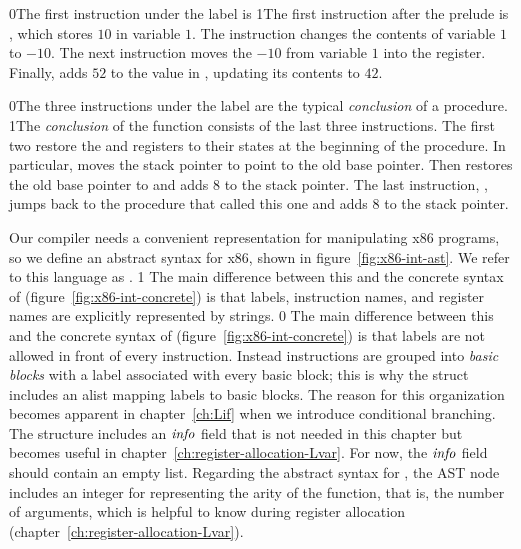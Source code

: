 \documentclass[7x10]{TimesAPriori_MIT}%
\def\racketEd{0}
\def\pythonEd{1}
\def\edition{1}
\newcommand{\racket}[1]{{\if\edition\racketEd{#1}\fi}}
\newcommand{\pythonColor}[0]{}
\newcommand{\python}[1]{{\if\edition\pythonEd\pythonColor #1\fi}}
\numberwithin{theorem}{chapter}
\numberwithin{definition}{chapter}
\numberwithin{equation}{chapter}
\begin{document}
\racket{The first instruction under the  label is}
%
\python{The first instruction after the prelude is}
%
, which stores $10$ in variable $1$.
%
The instruction  changes the contents of variable
$1$ to $-10$.
%
The next instruction moves the $-10$ from variable $1$ into the
 register.  Finally,  adds $52$ to
the value in , updating its contents to $42$.

\racket{The three instructions under the label  are the
  typical \emph{conclusion} of a procedure.}
%
\python{The \emph{conclusion}\index{subject}{conclusion} of the
  \code{main} function consists of the last three instructions.}
%
The first two restore the  and  registers to their
states at the beginning of the procedure. In particular,
 moves the stack pointer to point to the
old base pointer. Then  restores the old base pointer
to  and adds $8$ to the stack pointer.  The last instruction,
, jumps back to the procedure that called this one and adds
$8$ to the stack pointer.

Our compiler needs a convenient representation for manipulating x86
programs, so we define an abstract syntax for x86, shown in
figure~\ref{fig:x86-int-ast}. We refer to this language as
\LangXInt{}.
%
{\if\edition\pythonEd\pythonColor%
  The main difference between this and the concrete syntax of \LangXInt{}
  (figure~\ref{fig:x86-int-concrete}) is that labels, instruction
  names, and register names are explicitly represented by strings. 
\fi} %
{\if\edition\racketEd  
The main difference between this and the concrete syntax of \LangXInt{}
(figure~\ref{fig:x86-int-concrete}) is that labels are not allowed in
front of every instruction. Instead instructions are grouped into
\emph{basic blocks} with a
label associated with every basic block; this is why the 
struct includes an alist mapping labels to basic blocks. The reason for this
organization becomes apparent in chapter~\ref{ch:Lif} when we
introduce conditional branching. The  structure includes
an $\mathit{info}$ field that is not needed in this chapter but becomes
useful in chapter~\ref{ch:register-allocation-Lvar}.  For now, the
$\mathit{info}$ field should contain an empty list.
\fi}
%
Regarding the abstract syntax for , the  AST
node includes an integer for representing the arity of the function,
that is, the number of arguments, which is helpful to know during
register allocation (chapter~\ref{ch:register-allocation-Lvar}).
\end{document}
